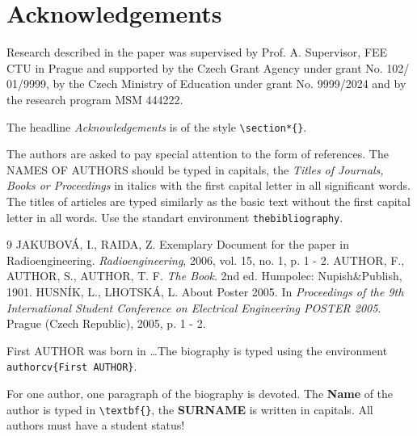 \documentclass{poster26}
\begin{document}
\section*{Acknowledgements}
Research described in the paper was supervised by Prof. A. Supervisor, FEE CTU in Prague and supported by the Czech Grant Agency under grant No. 102/ 01/9999, by the Czech Ministry of Education under grant No. 9999/2024 and by the research program MSM 444222.

The headline \emph{Acknowledgements} is of the  style \verb+\section*{}+.

The authors are asked to pay special attention to the form of references. The NAMES OF AUTHORS should be typed in capitals, the \emph{Titles of Journals, Books or Proceedings} in italics with the first capital letter in all significant words. The titles of articles are typed similarly as the basic text without the first capital letter in all words. Use the standart environment \verb+thebibliography+.

\begin{thebibliography}{9}
JAKUBOV\'A, I., RAIDA, Z. Exemplary Document for the paper in Radioengineering. \emph{Radioengineering}, 2006, vol. 15, no. 1, p. 1 - 2.
AUTHOR, F., AUTHOR, S., AUTHOR, T. F. \emph{The Book}. 2nd ed. Humpolec: Nupish\&Publish, 1901.
HUSN\'IK, L., LHOTSK\'A, L. About Poster 2005. In \emph{Proceedings of the 9th International Student Conference on Electrical Engineering POSTER 2005}. Prague (Czech Republic), 2005, p. 1 - 2.
\end{thebibliography}

\begin{authorcv}{First AUTHOR}
was born in \dots The biography is typed using the environment \verb+authorcv{First AUTHOR}+. 

For one author, one paragraph of the biography is devoted. The \textbf{Name} of the author is typed in  \verb+\textbf{}+, the \textbf{SURNAME} is written in capitals.  All authors must have a student status!
\end{authorcv}
\end{document}
